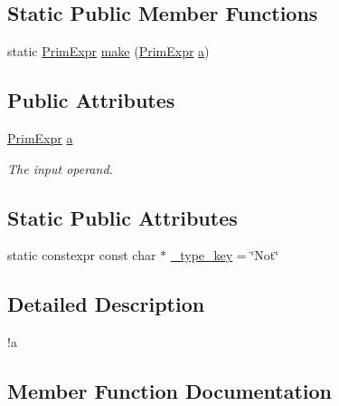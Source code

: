 \subsection*{Static Public Member Functions}
\begin{DoxyCompactItemize}
\item 
static \hyperlink{classtvm_1_1PrimExpr}{Prim\+Expr} \hyperlink{classtvm_1_1tir_1_1NotNode_a512704bc4daddd674f4f3ccf83f2cbcd}{make} (\hyperlink{classtvm_1_1PrimExpr}{Prim\+Expr} \hyperlink{classtvm_1_1tir_1_1NotNode_a2216c35efead7567a99c13750df5cd6e}{a})
\end{DoxyCompactItemize}
\subsection*{Public Attributes}
\begin{DoxyCompactItemize}
\item 
\hyperlink{classtvm_1_1PrimExpr}{Prim\+Expr} \hyperlink{classtvm_1_1tir_1_1NotNode_a2216c35efead7567a99c13750df5cd6e}{a}
\begin{DoxyCompactList}\small\item\em The input operand. \end{DoxyCompactList}\end{DoxyCompactItemize}
\subsection*{Static Public Attributes}
\begin{DoxyCompactItemize}
\item 
static constexpr const char $\ast$ \hyperlink{classtvm_1_1tir_1_1NotNode_a68713847b797749b76d716cecebb0faf}{\+\_\+type\+\_\+key} = \char`\"{}Not\char`\"{}
\end{DoxyCompactItemize}


\subsection{Detailed Description}
!a 

\subsection{Member Function Documentation}
